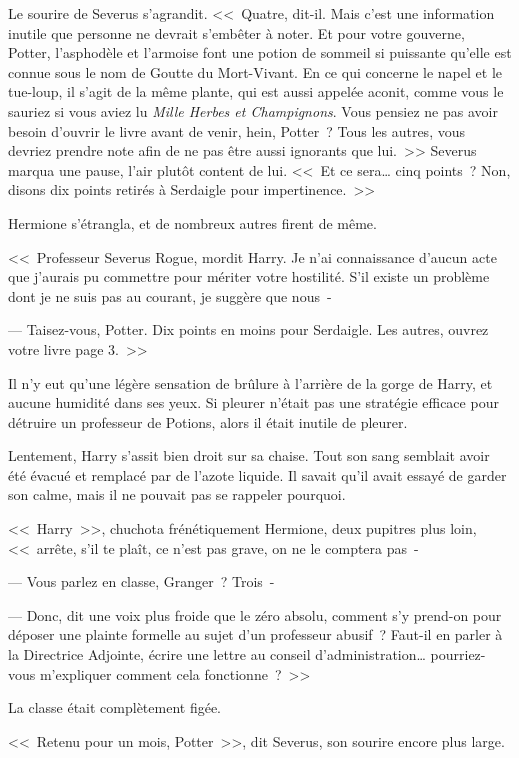Le sourire de Severus s'agrandit. <<~Quatre, dit-il. Mais c'est une information inutile que personne ne devrait s'embêter à noter. Et pour votre gouverne, Potter, l'asphodèle et l'armoise font une potion de sommeil si puissante qu'elle est connue sous le nom de Goutte du Mort-Vivant. En ce qui concerne le napel et le tue-loup, il s'agit de la même plante, qui est aussi appelée aconit, comme vous le sauriez si vous aviez lu \emph{Mille Herbes et Champignons}. Vous pensiez ne pas avoir besoin d'ouvrir le livre avant de venir, hein, Potter~? Tous les autres, vous devriez prendre note afin de ne pas être aussi ignorants que lui.~>> Severus marqua une pause, l'air plutôt content de lui. <<~Et ce sera… cinq points~? Non, disons dix points retirés à Serdaigle pour impertinence.~>>

Hermione s'étrangla, et de nombreux autres firent de même.

<<~Professeur Severus Rogue, mordit Harry. Je n'ai connaissance d'aucun acte que j'aurais pu commettre pour mériter votre hostilité. S'il existe un problème dont je ne suis pas au courant, je suggère que nous~-

--- Taisez-vous, Potter. Dix points en moins pour Serdaigle. Les autres, ouvrez votre livre page 3.~>>

Il n'y eut qu'une légère sensation de brûlure à l'arrière de la gorge de Harry, et aucune humidité dans ses yeux. Si pleurer n'était pas une stratégie efficace pour détruire un professeur de Potions, alors il était inutile de pleurer.

Lentement, Harry s'assit bien droit sur sa chaise. Tout son sang semblait avoir été évacué et remplacé par de l'azote liquide. Il savait qu'il avait essayé de garder son calme, mais il ne pouvait pas se rappeler pourquoi.

<<~Harry~>>, chuchota frénétiquement Hermione, deux pupitres plus loin, <<~arrête, s'il te plaît, ce n'est pas grave, on ne le comptera pas~-

--- Vous parlez en classe, Granger~? Trois~-

--- Donc, dit une voix plus froide que le zéro absolu, comment s'y prend-on pour déposer une plainte formelle au sujet d'un professeur abusif~? Faut-il en parler à la Directrice Adjointe, écrire une lettre au conseil d'administration… pourriez-vous m'expliquer comment cela fonctionne~?~>>

La classe était complètement figée.

<<~Retenu pour un mois, Potter~>>, dit Severus, son sourire encore plus large.

